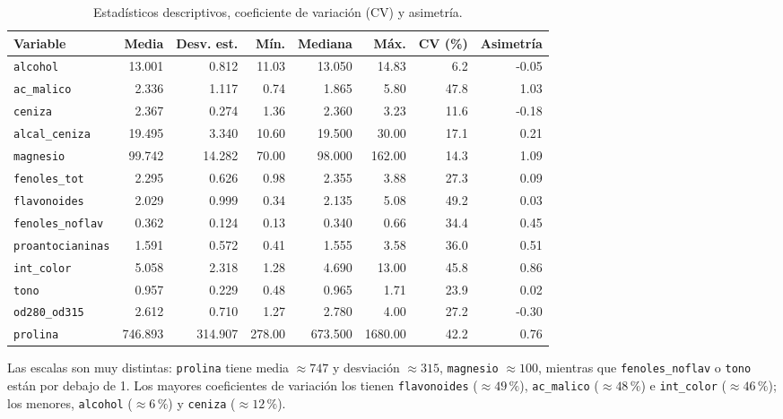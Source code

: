\documentclass[11pt,a4paper]{article}
\newcommand{\var}[1]{\texttt{#1}}
\begin{document}
\begin{table}[H]
\centering\small
\caption{Estadísticos descriptivos, coeficiente de variación (CV) y asimetría.}
\begin{tabular}{lrrrrrrr}
\toprule
Variable & Media & Desv. est. & Mín. & Mediana & Máx. & CV (\%) & Asimetría \\
\midrule
\texttt{alcohol} & 13.001 & 0.812 & 11.03 & 13.050 & 14.83 & 6.2 & -0.05 \\
\texttt{ac\_malico} & 2.336 & 1.117 & 0.74 & 1.865 & 5.80 & 47.8 & 1.03 \\
\texttt{ceniza} & 2.367 & 0.274 & 1.36 & 2.360 & 3.23 & 11.6 & -0.18 \\
\texttt{alcal\_ceniza} & 19.495 & 3.340 & 10.60 & 19.500 & 30.00 & 17.1 & 0.21 \\
\texttt{magnesio} & 99.742 & 14.282 & 70.00 & 98.000 & 162.00 & 14.3 & 1.09 \\
\texttt{fenoles\_tot} & 2.295 & 0.626 & 0.98 & 2.355 & 3.88 & 27.3 & 0.09 \\
\texttt{flavonoides} & 2.029 & 0.999 & 0.34 & 2.135 & 5.08 & 49.2 & 0.03 \\
\texttt{fenoles\_noflav} & 0.362 & 0.124 & 0.13 & 0.340 & 0.66 & 34.4 & 0.45 \\
\texttt{proantocianinas} & 1.591 & 0.572 & 0.41 & 1.555 & 3.58 & 36.0 & 0.51 \\
\texttt{int\_color} & 5.058 & 2.318 & 1.28 & 4.690 & 13.00 & 45.8 & 0.86 \\
\texttt{tono} & 0.957 & 0.229 & 0.48 & 0.965 & 1.71 & 23.9 & 0.02 \\
\texttt{od280\_od315} & 2.612 & 0.710 & 1.27 & 2.780 & 4.00 & 27.2 & -0.30 \\
\texttt{prolina} & 746.893 & 314.907 & 278.00 & 673.500 & 1680.00 & 42.2 & 0.76 \\
\bottomrule
\end{tabular}
\end{table}

Las escalas son muy distintas: \var{prolina} tiene media $\approx 747$ y desviación $\approx 315$, \var{magnesio} $\approx 100$, mientras que \var{fenoles\_noflav} o \var{tono} están por debajo de 1. Los mayores coeficientes de variación los tienen \var{flavonoides} ($\approx 49\,\%$), \var{ac\_malico} ($\approx 48\,\%$) e \var{int\_color} ($\approx 46\,\%$); los menores, \var{alcohol} ($\approx 6\,\%$) y \var{ceniza} ($\approx 12\,\%$).
\end{document}
